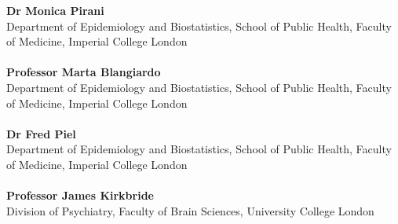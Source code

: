 

\begin{supervisors}

\textbf{Dr Monica Pirani} \\
Department of Epidemiology and Biostatistics, School of Public Health, Faculty of Medicine, Imperial College London \\ \\
\textbf{Professor Marta Blangiardo} \\
Department of Epidemiology and Biostatistics, School of Public Health, Faculty of Medicine, Imperial College London \\ \\
\textbf{Dr Fred Piel} \\
Department of Epidemiology and Biostatistics, School of Public Health, Faculty of Medicine, Imperial College London \\ \\
\textbf{Professor James Kirkbride} \\
Division of Psychiatry, Faculty of Brain Sciences, University College London

\end{supervisors}